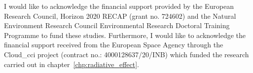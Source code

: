 \begin{acknowledgements}



I would like to acknowledge the financial support provided by the European Research Council, Horizon 2020 RECAP (grant no. 724602) and the Natural Environment Research Council Environmental Research Doctoral Training Programme to fund these studies. Furthermore, I would like to acknowledge the financial support received from the European Space Agency through the Cloud\_cci project (contract no.: 4000128637/20/INB) which funded the research carried out in chapter~\ref{chp:radiative_effect}.

\end{acknowledgements}